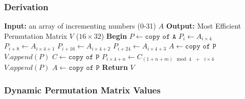 \documentclass[11pt]{article}
\theoremstyle{definition}
\theoremstyle{remark}
\begin{document}
\subsubsection{Derivation}

\begin{algorithm}[H] %
\caption{Dynamic Permutation Matrix Derivation Pseudo-code}
\begin{algorithmic}[1]  %
\State \textbf{Input:} an array of incrementing numbers (0-31) $A$ 
\State \textbf{Output:} Most Efficient Permutation Matrix $V$ ($16 \times 32$)
\State \textbf{Begin}
\State $P \gets \texttt{copy of A}$
		\State $P_i      \gets A_{i \times 4}$
		\State $P_{i+8}  \gets A_{i \times 4 + 1}$
		\State $P_{i+16} \gets A_{i \times 4 + 2}$
		\State $P_{i+24} \gets A_{i \times 4 + 3}$
	\EndFor
	\State $A \gets \texttt{copy of P}$
	\State $V.append(P)$
	\State $C \gets \texttt{copy of P}$
			\State $P_{i \times 4 + n} \gets C_{(1+n+m) \mod{4} \texttt{    } + \texttt{    } i \times 4}$
			\EndFor
		\EndFor
		\State $V.append(P)$
	\EndFor
	\State $A \gets \texttt{copy of P}$
\EndFor
\State \textbf{Return} $V$
\end{algorithmic}
\end{algorithm}
 
\subsubsection{Dynamic Permutation Matrix Values} \label{matrix} %

\renewcommand{\arraystretch}{1} %
\end{document}
